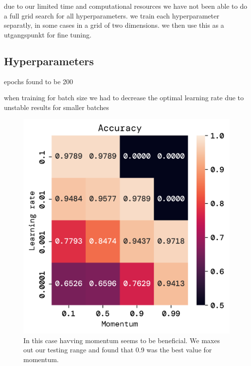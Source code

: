 \documentclass[twoside,11pt]{report}
\begin{document}
    due to our limited time and computational resources we have not been able to do a full grid search for all hyperparameters. 
    we train each hyperparameter separatly, in some cases in a grid of two dimensions. 
    we then use this as a utgangspunkt for fine tuning.

\subsection{Hyperparameters}
\label{sec:hyperparameters}
    epochs found to be 200 

    when training for batch size we had to decrease the optimal learning rate due to unstable results for smaller batches

    \begin{figure}[!ht]
        \begin{minipage}[t]{0.5\textwidth - 1mm}
            \begin{center}
                \includegraphics[width=\textwidth]{../runsAndFigures/accuracy_lr_gamma.png}
            \end{center}
            \caption
            {
                In this case havving momentum seems to be beneficial. 
                We maxes out our testing range and found that 0.9 was the best value for momentum. 
}
\end{minipage}
\end{figure}
\end{document}
